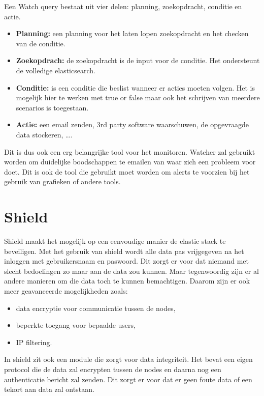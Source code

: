Een Watch query bestaat uit vier delen: planning, zoekopdracht, conditie en actie. 
\begin{itemize}
	\item \textbf{Planning: } een planning voor het laten lopen zoekopdracht en het checken van de conditie.
   
    \item \textbf{Zoekopdrach: } de zoekopdracht is de input voor de conditie. Het ondersteunt de volledige elasticsearch. 

	\item \textbf{Conditie: } is een conditie die beslist wanneer er acties moeten volgen. Het is mogelijk hier te werken met true or false maar ook het schrijven van meerdere scenarios is toegestaan.
    
    \item \textbf{Actie: } een email zenden, 3rd party software waarschuwen, de opgevraagde data stockeren, \dots.
\end{itemize}

Dit is dus ook een erg belangrijke tool voor het monitoren.
Watcher zal gebruikt worden om duidelijke boodschappen te emailen van waar zich een probleem voor doet.
Dit is ook de tool die gebruikt moet worden om alerts te voorzien bij het gebruik van grafieken of andere tools.

\section{Shield}
\label{sec:shield}

Shield maakt het mogelijk op een eenvoudige manier de elastic stack te beveiligen. Met het gebruik van shield wordt alle data pas vrijgegeven na het inloggen met gebruikersnaam en paswoord. Dit zorgt er voor dat niemand met slecht bedoelingen zo maar aan de data zou kunnen. 
Maar tegenwoordig zijn er al andere manieren om die data toch te kunnen bemachtigen. Daarom zijn er ook meer geavanceerde mogelijkheden zoals:
\begin{itemize}
	\item data encryptie voor communicatie tussen de nodes,
    
    \item  beperkte toegang voor bepaalde users,

	\item IP filtering.
\end{itemize}

In shield zit ook een module die zorgt voor data integriteit. Het bevat een eigen protocol die de data zal encrypten tussen de nodes en daarna nog een authenticatie bericht zal zenden. Dit zorgt er voor dat er geen foute data of een tekort aan data zal ontstaan.

